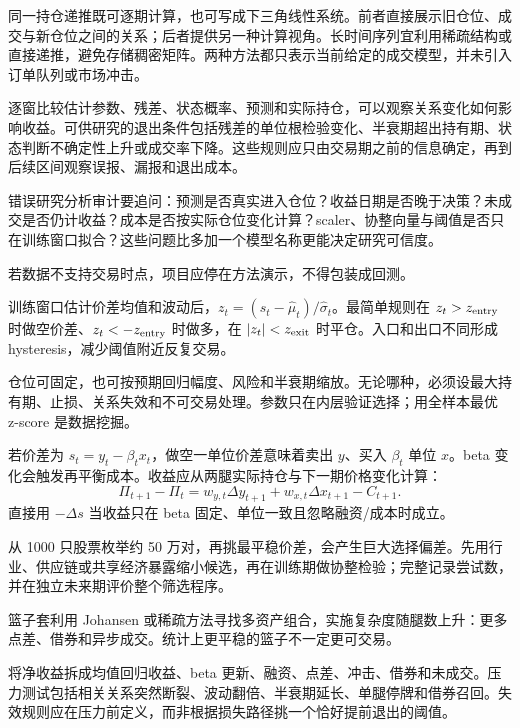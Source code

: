 同一持仓递推既可逐期计算，也可写成下三角线性系统。前者直接展示旧仓位、成交与新仓位之间的关系；后者提供另一种计算视角。长时间序列宜利用稀疏结构或直接递推，避免存储稠密矩阵。两种方法都只表示当前给定的成交模型，并未引入订单队列或市场冲击。


逐窗比较估计参数、残差、状态概率、预测和实际持仓，可以观察关系变化如何影响收益。可供研究的退出条件包括残差的单位根检验变化、半衰期超出持有期、状态判断不确定性上升或成交率下降。这些规则应只由交易期之前的信息确定，再到后续区间观察误报、漏报和退出成本。

错误研究分析审计要追问：预测是否真实进入仓位？收益日期是否晚于决策？未成交是否仍计收益？成本是否按实际仓位变化计算？scaler、协整向量与阈值是否只在训练窗口拟合？这些问题比多加一个模型名称更能决定研究可信度。

若数据不支持交易时点，项目应停在方法演示，不得包装成回测。


训练窗口估计价差均值和波动后，$z_t=(s_t-\hat\mu_t)/\hat\sigma_t$。最简单规则在 $z_t>z_{\rm entry}$ 时做空价差、$z_t<-z_{\rm entry}$ 时做多，在 $|z_t|<z_{\rm exit}$ 时平仓。入口和出口不同形成 hysteresis，减少阈值附近反复交易。

仓位可固定，也可按预期回归幅度、风险和半衰期缩放。无论哪种，必须设最大持有期、止损、关系失效和不可交易处理。参数只在内层验证选择；用全样本最优 z-score 是数据挖掘。


若价差为 $s_t=y_t-\beta_tx_t$，做空一单位价差意味着卖出 $y$、买入 $\beta_t$ 单位 $x$。beta 变化会触发再平衡成本。收益应从两腿实际持仓与下一期价格变化计算：
\[
\Pi_{t+1}-\Pi_t=w_{y,t}\Delta y_{t+1}
+w_{x,t}\Delta x_{t+1}-C_{t+1}.
\]
直接用 $-\Delta s$ 当收益只在 beta 固定、单位一致且忽略融资/成本时成立。


从 1000 只股票枚举约 50 万对，再挑最平稳价差，会产生巨大选择偏差。先用行业、供应链或共享经济暴露缩小候选，再在训练期做协整检验；完整记录尝试数，并在独立未来期评价整个筛选程序。

篮子套利用 Johansen 或稀疏方法寻找多资产组合，实施复杂度随腿数上升：更多点差、借券和异步成交。统计上更平稳的篮子不一定更可交易。


将净收益拆成均值回归收益、beta 更新、融资、点差、冲击、借券和未成交。压力测试包括相关关系突然断裂、波动翻倍、半衰期延长、单腿停牌和借券召回。失效规则应在压力前定义，而非根据损失路径挑一个恰好提前退出的阈值。

